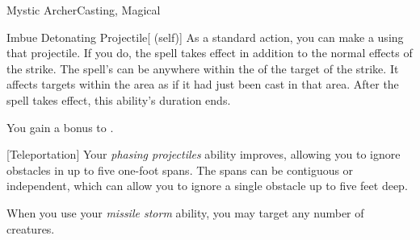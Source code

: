 \begin{feat}{Mystic Archer}{Casting, Magical}
\begin{attuneability}{Imbue Detonating Projectile}[ (self)]
            As a standard action, you can make a  using that projectile.
            If you do, the spell takes effect in addition to the normal effects of the strike.
            The spell's  can be anywhere within the  of the target of the strike.
            It affects targets within the area as if it had just been cast in that area.
            After the spell takes effect, this ability's duration ends.
        \end{attuneability}

         You gain a  bonus to .

        [Teleportation] Your \textit{phasing projectiles} ability improves, allowing you to ignore obstacles in up to five one-foot spans.
        The spans can be contiguous or independent, which can allow you to ignore a single obstacle up to five feet deep.

         When you use your \textit{missile storm} ability, you may target any number of creatures.
    \end{feat}

